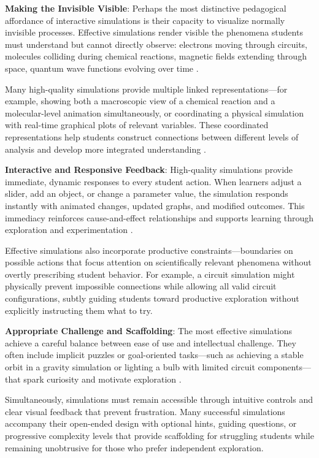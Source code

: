 \textbf{Making the Invisible Visible}: Perhaps the most distinctive pedagogical affordance of interactive simulations is their capacity to visualize normally invisible processes. Effective simulations render visible the phenomena students must understand but cannot directly observe: electrons moving through circuits, molecules colliding during chemical reactions, magnetic fields extending through space, quantum wave functions evolving over time \cite{phet2023, finkelstein2005phet}.

Many high-quality simulations provide multiple linked representations---for example, showing both a macroscopic view of a chemical reaction and a molecular-level animation simultaneously, or coordinating a physical simulation with real-time graphical plots of relevant variables. These coordinated representations help students construct connections between different levels of analysis and develop more integrated understanding \cite{phet2023}.

\textbf{Interactive and Responsive Feedback}: High-quality simulations provide immediate, dynamic responses to every student action. When learners adjust a slider, add an object, or change a parameter value, the simulation responds instantly with animated changes, updated graphs, and modified outcomes. This immediacy reinforces cause-and-effect relationships and supports learning through exploration and experimentation \cite{phet2023}.

Effective simulations also incorporate productive constraints---boundaries on possible actions that focus attention on scientifically relevant phenomena without overtly prescribing student behavior. For example, a circuit simulation might physically prevent impossible connections while allowing all valid circuit configurations, subtly guiding students toward productive exploration without explicitly instructing them what to try.

\textbf{Appropriate Challenge and Scaffolding}: The most effective simulations achieve a careful balance between ease of use and intellectual challenge. They often include implicit puzzles or goal-oriented tasks---such as achieving a stable orbit in a gravity simulation or lighting a bulb with limited circuit components---that spark curiosity and motivate exploration \cite{phet2023}.

Simultaneously, simulations must remain accessible through intuitive controls and clear visual feedback that prevent frustration. Many successful simulations accompany their open-ended design with optional hints, guiding questions, or progressive complexity levels that provide scaffolding for struggling students while remaining unobtrusive for those who prefer independent exploration.

